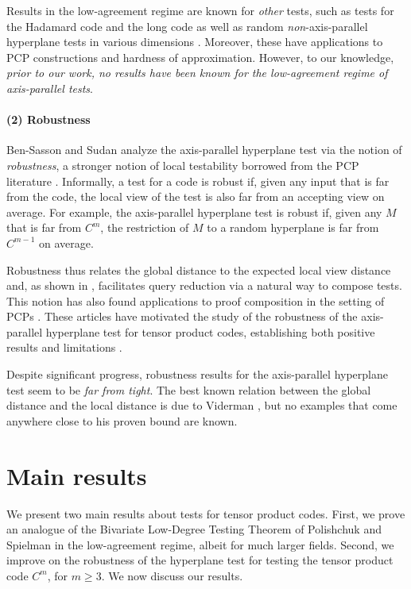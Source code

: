 \documentclass[11pt]{article}
\numberwithin{equation}{section}
\theoremstyle{definition}
\theoremstyle{plain}
\theoremstyle{plain}
\newcommand{\colored}{}
\newcommand{\testerinput}{\colored{M}} %
\newcommand{\parhead}{\paragraph}
\begin{document}
Results in the low-agreement regime are known for \emph{other} tests, such as tests for the Hadamard code \cite{BellareCHKS96} and the long code \cite{Hastad01} as well as random \emph{non}-axis-parallel hyperplane tests in various dimensions \cite{RazS97,AroraS03,MoshkovitzR08-ldt}. Moreover, these have applications to PCP constructions and hardness of approximation. However, to our knowledge,
%
\emph{prior to our work, no results %
have been  %
known for the low-agreement regime of axis-parallel tests}.

\parhead{(2) Robustness}
Ben-Sasson and Sudan \cite{Ben-SassonS06} analyze the axis-parallel hyperplane test via the notion of \emph{robustness}, a stronger notion of local testability borrowed from the PCP literature \cite{BenSassonGHSV06,DinurR04}. Informally, a test for a code is robust if, given any input that is far from the code, the local view of the test is also far from an accepting view on average. For example, the axis-parallel hyperplane test is robust if, given any $\testerinput$ that is far from $C^{m}$, the restriction of $\testerinput$ to a random hyperplane is far from $C^{m-1}$ on average.

Robustness thus relates the global distance to the expected local view distance and, as shown in \cite{Ben-SassonS06}, facilitates query reduction via a natural way to compose
%
tests.  This notion   %
has also found applications to proof composition in the setting of PCPs \cite{BenSassonGHSV06}.
%
These articles have %
motivated the study of the robustness of the axis-parallel hyperplane test for tensor product codes, establishing both positive results \cite{DinurSW06,BenSassonV08,BenSassonV15,Viderman12} and limitations \cite{Valiant05,CoppersmithR05,GoldreichM12}.

Despite significant progress, robustness results for the axis-parallel hyperplane test seem to be \emph{far from tight}. The best known relation between the global distance and the local distance is due to Viderman \cite{Viderman12}, but no examples that come anywhere close to his proven bound are known.


%
%
%
\section{Main results}
\label{sec:our-results}

We present two main results about tests for tensor product codes. First, we prove an analogue of the Bivariate Low-Degree Testing Theorem of Polishchuk and Spielman \cite{PolishchukS94} in the low-agreement regime, albeit
%
for much larger fields.   %
Second, we improve on the robustness of the hyperplane test for testing the tensor product code $C^{m}$, for $m \geq 3$. We now discuss our results.
\end{document}
